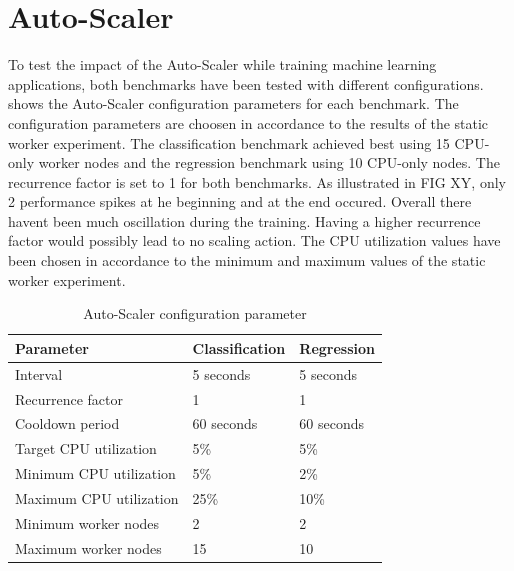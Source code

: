 \section{Auto-Scaler}
To test the impact of the Auto-Scaler while training machine learning applications, both benchmarks have been tested with different configurations.  shows the Auto-Scaler configuration parameters for each benchmark.
The configuration parameters are choosen in accordance to the results of the static worker experiment.
The classification benchmark achieved best using 15 CPU-only worker nodes and the regression benchmark using 10 CPU-only nodes.
The recurrence factor is set to 1 for both benchmarks. As illustrated in FIG XY, only 2 performance spikes at he beginning and at the end occured. Overall there havent been much oscillation during the training. Having a higher recurrence factor would possibly lead to no scaling action.
The CPU utilization values have been chosen in accordance to the minimum and maximum values of the static worker experiment.
\begin{table}[]
\centering
\begin{tabular}{@{}l|ll@{}}
\toprule
Parameter               & Classification & Regression \\ \midrule
Interval                & 5 seconds      & 5 seconds  \\
Recurrence factor       & 1              & 1          \\
Cooldown period         & 60 seconds     & 60 seconds \\
Target CPU utilization  & 5\%           & 5\%        \\
Minimum CPU utilization & 5\%           & 2\%       \\
Maximum CPU utilization & 25\%           & 10\%       \\
Minimum worker nodes    & 2              & 2         \\
Maximum worker nodes    & 15              & 10         \\ \bottomrule
\end{tabular}
\caption{Auto-Scaler configuration parameter}
\label{table:07_auto-scaler_config_parameter}
\end{table}


